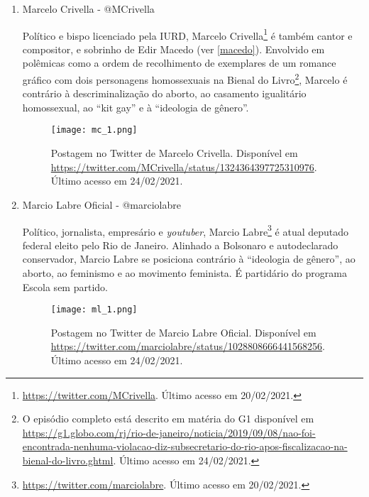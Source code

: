 \documentclass[
	12pt,				%
	openright,			%
	twoside,			%
	a4paper,			%
	english,			%
	brazil				%
	]{abntex2}
\begin{document}
\begin{anexosenv}
\begin{enumerate}
 \begin{figure}[!htbp]
    \centering
    \texttt{[image: mvh\_2.png]}
    \caption{Postagem no Twitter de Marcel van Hattem. Disponível em \url{https://twitter.com/marcelvanhattem/status/613509063121444864}. Último acesso em 24/02/2021.}
 \end{figure}
 
  
 \item Marcelo Crivella - @MCrivella
 
 Político e bispo licenciado pela IURD, Marcelo Crivella\footnote{\url{https://twitter.com/MCrivella}. Último acesso em 20/02/2021.} é também cantor e compositor, e sobrinho de Edir Macedo (ver \ref{macedo}). Envolvido em polêmicas como a ordem de recolhimento de exemplares de um romance gráfico com dois personagens homossexuais na Bienal do Livro\footnote{O episódio completo está descrito em matéria do G1 disponível em \url{https://g1.globo.com/rj/rio-de-janeiro/noticia/2019/09/08/nao-foi-encontrada-nenhuma-violacao-diz-subsecretario-do-rio-apos-fiscalizacao-na-bienal-do-livro.ghtml}. Último acesso em 24/02/2021.}, Marcelo é contrário à descriminalização do aborto, ao casamento igualitário homossexual, ao ``kit gay'' e à ``ideologia de gênero''.
 
 \begin{figure}[!htbp]
    \centering
    \texttt{[image: mc\_1.png]}
    \caption{Postagem no Twitter de Marcelo Crivella. Disponível em \url{https://twitter.com/MCrivella/status/1324364397725310976}. Último acesso em 24/02/2021.}
 \end{figure}
  
  \newpage
  
 \item Marcio Labre Oficial - @marciolabre
 
 Político, jornalista, empresário e \textit{youtuber}, Marcio Labre\footnote{\url{https://twitter.com/marciolabre}. Último acesso em 20/02/2021.} é atual deputado federal eleito pelo Rio de Janeiro. Alinhado a Bolsonaro e autodeclarado conservador, Marcio Labre se posiciona contrário à ``ideologia de gênero'', ao aborto, ao feminismo e ao movimento feminista. É partidário do programa Escola sem partido.
 
 \begin{figure}[!htbp]
    \centering
    \texttt{[image: ml\_1.png]}
    \caption{Postagem no Twitter de Marcio Labre Oficial. Disponível em \url{https://twitter.com/marciolabre/status/1028808666441568256}. Último acesso em 24/02/2021.}
 \end{figure}
 

\end{enumerate}
\end{anexosenv}
\end{document}
